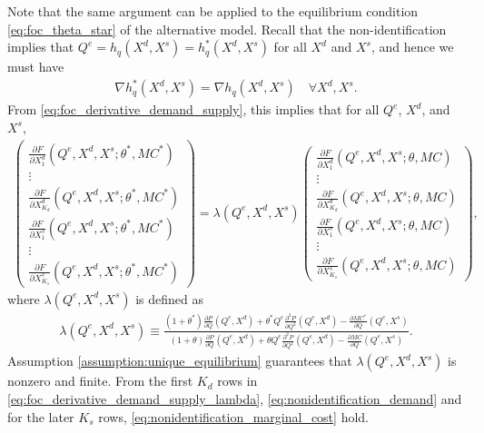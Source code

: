 \documentclass[11pt, a4paper]{article}
\theoremstyle{remark}
\begin{document}
Note that the same argument can be applied to the equilibrium condition \eqref{eq:foc_theta_star} of the alternative model.
Recall that the non-identification implies that $Q^e = h_q(X^{d}, X^{s}) = h_q^{*}(X^{d}, X^{s})$ for all $X^{d}$ and $X^{s}$, and hence we must have
\begin{align}
    \nabla h_q^{*}(X^{d}, X^{s}) = \nabla h_q(X^{d}, X^{s}) \quad \forall X^{d}, X^{s}. \label{eq:observale_equivalence_derivative}
\end{align}
From \eqref{eq:foc_derivative_demand_supply}, this implies that for all $Q^e$, $X^{d}$, and $X^{s}$,
\begin{align}
    \begin{pmatrix}
        \frac{\partial F}{\partial X^{d}_{1}}(Q^e, X^{d}, X^{s}; \theta^{*}, MC^{*})\\
        \vdots \\
        \frac{\partial F}{\partial X^{d}_{K_d}}(Q^e, X^{d}, X^{s}; \theta^{*}, MC^{*})\\
        \frac{\partial F}{\partial X^{s}_{1}}(Q^e, X^{d}, X^{s}; \theta^{*}, MC^{*})\\
        \vdots \\
        \frac{\partial F}{\partial X^{s}_{K_s}}(Q^e, X^{d}, X^{s}; \theta^{*}, MC^{*})
    \end{pmatrix}
    = \lambda(Q^e, X^{d}, X^{s})
    \begin{pmatrix}
        \frac{\partial F}{\partial X^{d}_{1}}(Q^e, X^{d}, X^{s}; \theta, MC)\\
        \vdots \\
        \frac{\partial F}{\partial X^{d}_{K_d}}(Q^e, X^{d}, X^{s}; \theta, MC)\\
        \frac{\partial F}{\partial X^{s}_{1}}(Q^e, X^{d}, X^{s}; \theta, MC)\\
        \vdots \\
        \frac{\partial F}{\partial X^{s}_{K_s}}(Q^e, X^{d}, X^{s}; \theta, MC)
    \end{pmatrix},\label{eq:foc_derivative_demand_supply_lambda}
\end{align}
where $\lambda(Q^e, X^{d}, X^{s})$ is defined as
\begin{align}
    \lambda(Q^e, X^{d}, X^{s}) \equiv \frac{(1+\theta^{*})\frac{\partial P}{\partial Q}(Q^e, X^{d}) + \theta^{*} Q^e\frac{\partial^2 P}{\partial Q^2}(Q^e, X^{d}) - \frac{\partial MC^{*}}{\partial Q}(Q^e, X^{s})}{(1+\theta)\frac{\partial P}{\partial Q}(Q^e, X^{d}) + \theta Q^e\frac{\partial^2 P}{\partial Q^2}(Q^e, X^{d}) - \frac{\partial MC}{\partial Q}(Q^e, X^{s})}.
\end{align}
Assumption \ref{assumption:unique_equilibrium} guarantees that $\lambda(Q^e, X^{d}, X^{s})$ is nonzero and finite.
From the first $K_d$ rows in \eqref{eq:foc_derivative_demand_supply_lambda}, \eqref{eq:nonidentification_demand} and for the later $K_s$ rows, \eqref{eq:nonidentification_marginal_cost} hold.
\end{document}
